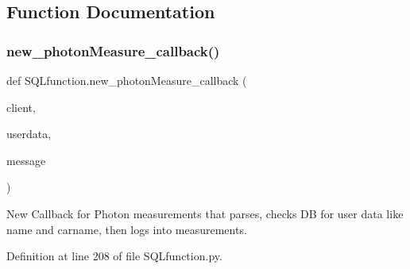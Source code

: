 \subsection{Function Documentation}
\mbox{\label{namespace_s_q_lfunction_a356dd5906768f7dd778408f466e9f9b4}} 
\subsubsection{\texorpdfstring{new\+\_\+photon\+Measure\+\_\+callback()}{new\_photonMeasure\_callback()}}
{\footnotesize\ttfamily def S\+Q\+Lfunction.\+new\+\_\+photon\+Measure\+\_\+callback (\begin{DoxyParamCaption}\item[{}]{client,  }\item[{}]{userdata,  }\item[{}]{message }\end{DoxyParamCaption})}



New Callback for Photon measurements that parses, checks DB for user data like name and carname, then logs into \textquotesingle{}measurements\textquotesingle{}. 



Definition at line 208 of file S\+Q\+Lfunction.\+py.


